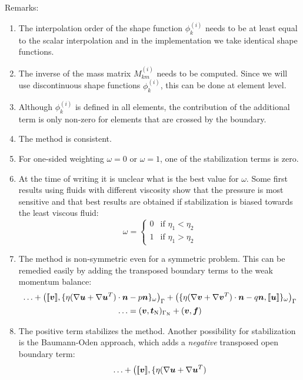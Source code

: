 Remarks:
\begin{enumerate}
   \item The interpolation order of the shape function $\phi^{(i)}_k$
 needs to be at
least equal to the scalar interpolation and in the implementation we
 take identical shape functions.
   \item The inverse of the mass matrix $M^{(i)}_{km}$ needs to be computed.
 Since we
will use discontinuous shape functions $\phi^{(i)}_k$, this can be done at
element level.
   \item Although $\phi^{(i)}_k$ is defined in all elements,
 the contribution of the
additional term is only non-zero for elements that are crossed by the boundary.
   \item The method is consistent.
   \item For one-sided weighting $\omega=0$ or $\omega=1$, one of the
         stabilization terms is zero.
   \item At the time of writing it is unclear what is the best value for
         $\omega$. Some first results using fluids with different viscosity 
         show that the pressure is most sensitive
         and that best results are obtained if stabilization
         is biased towards the least viscous fluid:
         \[ \omega=
             \begin{cases}
                0 & \text{if }\eta_1<\eta_2 \\
                1 & \text{if }\eta_1>\eta_2
             \end{cases}
         \]
\item
The method is non-symmetric even for a symmetric problem.
This can be remedied
easily by adding the transposed boundary terms to the
weak momentum balance:
\begin{multline}
  \ldots
    +\big(\text{[\![}\boldsymbol{v}\text{]\!]},\{\eta(\nabla\boldsymbol{u}+\nabla\boldsymbol{u}^T)
         \cdot\boldsymbol{n}-p\boldsymbol{n}\}_\omega\big)_{\Gamma}
    +\big(\{\eta(\nabla\boldsymbol{v}+\nabla\boldsymbol{v}^T)
         \cdot\boldsymbol{n}-q\boldsymbol{n},\text{[\![}\boldsymbol{u}\text{]\!]}\}_\omega\big)_{\Gamma}\\
    \ldots=(\boldsymbol{v},\boldsymbol{t}_{\text{N}})_{\Gamma_{\text{N}}}+(\boldsymbol{v},\boldsymbol{f})
   \label{eq:interfacestokestransposed}
\end{multline}
   \item The positive term stabilizes the method. Another possibility for
stabilization is the Baumann-Oden approach, which adds a \emph{negative}
         transposed open boundary term:
\begin{multline}
  \ldots
    +\big(\lj\vek v\rj,\{\eta(\nabla\vek u+\nabla\vek u^T)

\end{multline}
\end{enumerate}

